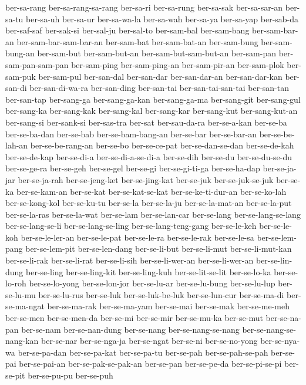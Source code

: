 {ber-sa-rang ber-sa-rang-sa-rang ber-sa-ri ber-sa-rung ber-sa-sak
ber-sa-sar-an ber-sa-tu ber-sa-uh ber-sa-ur ber-sa-wa-la ber-sa-wah
ber-sa-ya ber-sa-yap ber-sab-da ber-saf-saf ber-sak-si ber-sal-ju
ber-sal-to ber-sam-bal ber-sam-bang ber-sam-bar-an ber-sam-bar-sam-bar-an
ber-sam-bat ber-sam-bat-an ber-sam-bung ber-sam-bung-an ber-sam-but
ber-sam-but-an ber-sam-but-sam-but-an ber-sam-pan ber-sam-pan-sam-pan
ber-sam-ping ber-sam-ping-an ber-sam-pir-an ber-sam-plok ber-sam-puk
ber-sam-pul ber-san-dal ber-san-dar ber-san-dar-an ber-san-dar-kan
ber-san-di ber-san-di-wa-ra ber-san-ding ber-san-tai ber-san-tai-san-tai
ber-san-tan ber-san-tap ber-sang-ga ber-sang-ga-kan ber-sang-ga-ma
ber-sang-git ber-sang-gul ber-sang-ka ber-sang-kak ber-sang-kal
ber-sang-kar ber-sang-kut ber-sang-kut-an ber-sang-si ber-sank-si
ber-sas-tra ber-sat ber-sau-da-ra ber-se-a-kan ber-se-ba ber-se-ba-dan
ber-se-bab ber-se-bam-bang-an ber-se-bar ber-se-bar-an ber-se-be-lah-an
ber-se-be-rang-an ber-se-bo ber-se-ce-pat ber-se-dan-se-dan ber-se-de-kah
ber-se-de-kap ber-se-di-a ber-se-di-a-se-di-a ber-se-dih ber-se-du
ber-se-du-se-du ber-se-ge-ra ber-se-geh ber-se-gel ber-se-gi
ber-se-gi-ti-ga ber-se-ha-dap ber-se-ja-jar ber-se-ja-rah ber-se-jeng-ket
ber-se-jing-kat ber-se-juk ber-se-juk-se-juk ber-se-ka ber-se-kam-an
ber-se-kat ber-se-kat-se-kat ber-se-ke-ti-dur-an ber-se-ko-lah
ber-se-kong-kol ber-se-ku-tu ber-se-la ber-se-la-ju ber-se-la-mat-an
ber-se-la-put ber-se-la-ras ber-se-la-wat ber-se-lam ber-se-lan-car
ber-se-lang ber-se-lang-se-lang ber-se-lang-se-li ber-se-lang-se-ling
ber-se-lang-teng-gang ber-se-le-keh ber-se-le-koh ber-se-le-ler-an
ber-se-le-pat ber-se-le-ra ber-se-le-rak ber-se-le-sa ber-se-lem-pang
ber-se-lem-pit ber-se-len-dang ber-se-li-but ber-se-li-mut
ber-se-li-mut-kan ber-se-li-rak ber-se-li-rat ber-se-li-sih
ber-se-li-wer-an ber-se-li-wer-an ber-se-lin-dung ber-se-ling
ber-se-ling-kit ber-se-ling-kuh ber-se-lit-se-lit ber-se-lo-ka
ber-se-lo-roh ber-se-lo-yong ber-se-lon-jor ber-se-lu-ar ber-se-lu-bung
ber-se-lu-lup ber-se-lu-mu ber-se-lu-rus ber-se-luk ber-se-luk-be-luk
ber-se-lun-cur ber-se-ma-di ber-se-ma-ngat ber-se-ma-rak ber-se-ma-yam
ber-se-mai ber-se-mak ber-se-me-meh ber-se-men ber-se-men-da ber-se-mi
ber-se-mir ber-se-mu-ka ber-se-mut ber-se-na-pan ber-se-nam
ber-se-nan-dung ber-se-nang ber-se-nang-se-nang ber-se-nang-se-nang-kan
ber-se-nar ber-se-nga-ja ber-se-ngat ber-se-ni ber-se-no-yong
ber-se-nya-wa ber-se-pa-dan ber-se-pa-kat ber-se-pa-tu ber-se-pah
ber-se-pah-se-pah ber-se-pai ber-se-pai-an ber-se-pak-se-pak-an ber-se-pan
ber-se-pe-da ber-se-pi-se-pi ber-se-pit ber-se-pu-pu ber-se-puh
}
